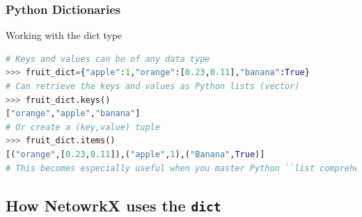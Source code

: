 \documentclass[xcolor=dvipsnames, 9pt]{beamer}
\begin{document}
\begin{frame}[fragile]
    \frametitle{Python Dictionaries}
    \begin{block}{Working with the dict type}
        \scriptsize{\begin{lstlisting}[language=Python]
# Keys and values can be of any data type
>>> fruit_dict={"apple":1,"orange":[0.23,0.11],"banana":True}
# Can retrieve the keys and values as Python lists (vector)
>>> fruit_dict.keys()
["orange","apple","banana"]
# Or create a (key,value) tuple
>>> fruit_dict.items()
[("orange",[0.23,0.11]),("apple",1),("Banana",True)]
# This becomes especially useful when you master Python ``list comprehension''
            \end{lstlisting}}
        \end{block}
\end{frame}


\subsection{How NetowrkX uses the \texttt{dict}} %
\label{sub:how_netowrkx_uses_the_dict}
\end{document}
